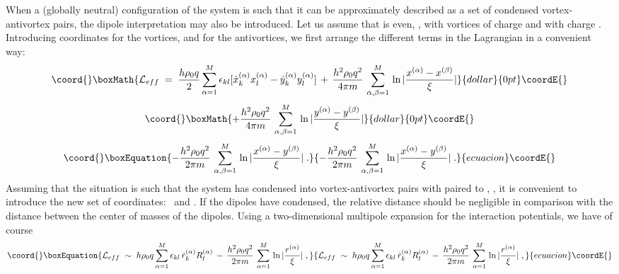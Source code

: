 \documentclass[a4paper,12pt]{article} \tolerance=200
\begin{document}
When a (globally neutral) configuration of the system is such that it
can be approximately described as a set of condensed vortex-antivortex
pairs, the dipole interpretation may also be introduced. Let us assume
that \coordHE{} is even, \coordHE{}, with \coordHE{} vortices of charge \coordHE{} and \coordHE{}
with charge \coordHE{}. Introducing coordinates \coordHE{} for the
vortices, and \coordHE{} for the antivortices, we first arrange the
different terms in the Lagrangian in a convenient way:
$$\coord{}\boxMath{
{\mathcal L}_{eff}\;=\; \frac{h \rho_0 q}{2} \sum_{\alpha = 1}^M \epsilon_{kl} [\dot{x}^{(\alpha)}_k x^{(\alpha)}_l - \dot{y}^{(\alpha)}_k y^{(\alpha)}_l]
\,+\, 
\frac{h^2\rho_0 q^2}{4\pi m}\,\sum_{\alpha,\beta=1}^M \, \ln |\frac{x^{(\alpha)} - x^{(\beta)}}{\xi}| 
}{dollar}{0pt}\coordE{}$$  $$\coord{}\boxMath{
+ \frac{h^2\rho_0 q^2}{4\pi m}\,\sum_{\alpha,\beta=1}^M \, \ln |\frac{y^{(\alpha)} - y^{(\beta)}}{\xi}| 
}{dollar}{0pt}\coordE{}$$
\begin{equation}\coord{}\boxEquation{\label{eq:fq4}
- \frac{h^2\rho_0 q^2}{2\pi m}\,\sum_{\alpha,\beta=1}^M \, \ln |\frac{x^{(\alpha)} - y^{(\beta)}}{\xi}| \;.
}{- \frac{h^2\rho_0 q^2}{2\pi m}\,\sum_{\alpha,\beta=1}^M \, \ln |\frac{x^{(\alpha)} - y^{(\beta)}}{\xi}| \;.
}{ecuacion}\coordE{}\end{equation}
Assuming that the situation is such that the system has condensed into
vortex-antivortex pairs with \coordHE{} paired to \coordHE{}, \myHighlight{$\forall \alpha$}\coordHE{}, it
is convenient to introduce the new set of coordinates:~\mbox{\coordHE{}} and {\coordHE{}}. If the
dipoles have condensed, the relative distance \coordHE{} should be
negligible in comparison with the distance between the center of
masses of the dipoles. Using a two-dimensional multipole expansion
for the interaction potentials, we have of course
\begin{equation}\coord{}\boxEquation{\label{eq:fq5}
{\mathcal L}_{eff}\;\sim\; h \rho_0 q \sum_{\alpha = 1}^M \epsilon_{kl} \, \dot{r}^{(\alpha)}_k  R^{(\alpha)}_l 
\,-\, \frac{h^2\rho_0 q^2}{2 \pi m}\,\sum_{\alpha=1}^M \, \ln |\frac{r^{(\alpha)}}{\xi}|\;,
}{{\mathcal L}_{eff}\;\sim\; h \rho_0 q \sum_{\alpha = 1}^M \epsilon_{kl} \, \dot{r}^{(\alpha)}_k  R^{(\alpha)}_l 
\,-\, \frac{h^2\rho_0 q^2}{2 \pi m}\,\sum_{\alpha=1}^M \, \ln |\frac{r^{(\alpha)}}{\xi}|\;,
}{ecuacion}\coordE{}\end{equation}
\end{document}
